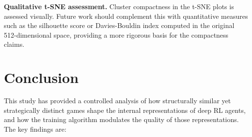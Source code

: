 \documentclass[a4paper]{article}
\begin{document}
\textbf{Qualitative t-SNE assessment.} Cluster compactness in the t-SNE plots is assessed visually. Future work should complement this with quantitative measures such as the silhouette score or Davies-Bouldin index computed in the original 512-dimensional space, providing a more rigorous basis for the compactness claims.

\section{Conclusion}
\label{sec:conclusion}

This study has provided a controlled analysis of how structurally similar yet strategically distinct games shape the internal representations of deep RL agents, and how the training algorithm modulates the quality of those representations. The key findings are:
\end{document}
